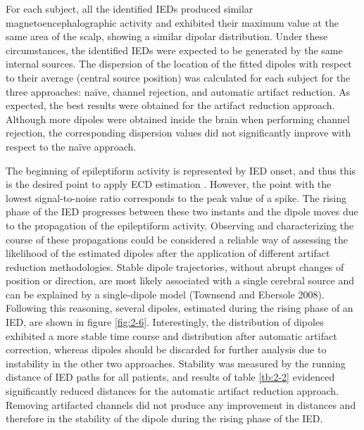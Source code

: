 For each subject, all the identified IEDs produced similar magnetoencephalographic activity and exhibited their maximum value at the same area of the scalp, showing a similar dipolar distribution. Under these circumstances, the identified IEDs were expected to be generated by the same internal sources. The dispersion of the location of the fitted dipoles with respect to their average (central source position) was calculated for each subject for the three approaches: naïve, channel rejection, and automatic artifact reduction. As expected, the best results were obtained for the artifact reduction approach. Although more dipoles were obtained inside the brain when performing channel rejection, the corresponding dispersion values did not significantly improve with respect to the naïve approach.

The beginning of epileptiform activity is represented by IED onset, and thus this is the desired point to apply ECD estimation \citep{Bagic2011}. However, the point with the lowest signal-to-noise ratio corresponds to the peak value of a spike. The rising phase of the IED progresses between these two instants and the dipole moves due to the propagation of the epileptiform activity. Observing and characterizing the course of these propagations could be considered a reliable way of assessing the likelihood of the estimated dipoles after the application of different artifact reduction methodologies. Stable dipole trajectories, without abrupt changes of position or direction, are most likely associated with a single cerebral source and can be explained by a single-dipole model \citep{Townsend2008} (Townsend and Ebersole 2008). Following this reasoning, several dipoles, estimated during the rising phase of an IED, are shown in figure \ref{fig:2-6}. Interestingly, the distribution of dipoles exhibited a more stable time course and distribution after automatic artifact correction, whereas dipoles should be discarded for further analysis due to instability in the other two approaches. Stability was measured by the running distance of IED paths for all patients, and results of table \ref{tb:2-2} evidenced significantly reduced distances for the automatic artifact reduction approach. Removing artifacted channels did not produce any improvement in distances and therefore in the stability of the dipole during the rising phase of the IED.

